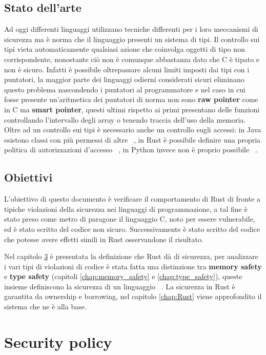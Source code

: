 \documentclass[Lau,binding=0.6cm]{sapthesis}
\begin{document}
\section {Stato dell'arte}
Ad oggi differenti linguaggi utilizzano tecniche differenti per i loro meccanismi di sicurezza ma è norma che il linguaggio presenti un sistema di tipi.
Il controllo sui tipi vieta automaticamente qualsiasi azione che coinvolga oggetti di tipo non corrispondente, nonostante ciò non è comunque abbastanza dato che C è tipato e non è sicuro.
Infatti è possibile oltrepassare alcuni limiti imposti dai tipi con i puntatori, la maggior parte dei linguaggi odierni considerati sicuri eliminano questo problema nascondendo i puntatori al programmatore e nel caso in cui fosse presente un'aritmetica dei puntatori di norma non sono \textbf{raw pointer} come in C ma \textbf{smart pointer}, questi ultimi rispetto ai primi presentano delle funzioni controllando l'intervallo degli array o tenendo traccia dell'uso della memoria.
Oltre ad un controllo sui tipi è necessario anche un controllo sugli accessi: in Java esistono classi con più permessi di altre ~\cite{java:privilege}, in Rust è possibile definire una propria politica di autorizzazioni d'accesso ~\cite{rust:auth}, in Python invece non è proprio possibile ~\cite{python:privilege}.

\section{Obiettivi}
L'obiettivo di questo documento è verificare il comportamento di Rust di fronte a tipiche violazioni della sicurezza nei linguaggi di programmazione, a tal fine è stato preso come metro di paragone il linguaggio C, noto per essere vulnerabile, ed è stato scritto del codice non sicuro.
Successivamente è stato scritto del codice che potesse avere effetti simili in Rust osservandone il risultato.

Nel capitolo \ref{chap:security_policy} è presentata la definizione che Rust dà di sicurezza, per analizzare i vari tipi di violazioni di codice è stata fatta una distinzione tra \textbf{memory safety} e \textbf{type safety} (capitoli \ref{chap:memory_safety} e \ref{chap:type_safety}), queste insieme definiscono la sicurezza di un linguaggio ~\cite{nino:security_programming_language}.
La sicurezza in Rust è garantita da ownership e borrowing, nel capitolo \ref{chap:Rust} viene approfondito il sistema che ne è alla base.


\chapter{Security policy} \label{chap:security_policy}
\end{document}
